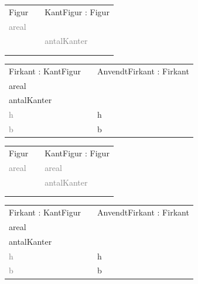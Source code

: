 \begin{frame}[fragile] 
\begin{table}[h]
\begin{tabular}{|l|l|l|}
 \cline{1-1} \cline{3-3} 
Figur          &  & KantFigur : Figur    \\ \cline{1-1} \cline{3-3} 
\textcolor{gray}{areal} &  &                      \\
               &  &  \textcolor{gray}{antalKanter} \\
               &  &                      \\
               &  &                      \\ \cline{1-1} \cline{3-3} 
\end{tabular}
\end{table}
\begin{table}[h]
\begin{tabular}{|l|l|l|}
 \cline{1-1} \cline{3-3} 
 Firkant : KantFigur &  & AnvendtFirkant : Firkant    \\ \cline{1-1} \cline{3-3} 
areal      &  &                      \\
antalKanter     &  &                      \\
\textcolor{gray}{h}          &  & h               \\
\textcolor{gray}{b}          &  & b              \\ \cline{1-1} \cline{3-3} 
\end{tabular}
\end{table}
\end{frame}

\begin{frame}[fragile] 
\begin{table}[h]
\begin{tabular}{|l|l|l|}
 \cline{1-1} \cline{3-3} 
Figur          &  & KantFigur : Figur    \\ \cline{1-1} \cline{3-3} 
\textcolor{gray}{areal} &  & \textcolor{gray}{areal}       \\
               &  & \textcolor{gray}{antalKanter} \\
               &  &                      \\
               &  &                      \\ \cline{1-1} \cline{3-3} 
\end{tabular}
\end{table}
\begin{table}[h]
\begin{tabular}{|l|l|l|}
 \cline{1-1} \cline{3-3} 
Firkant : KantFigur &  & AnvendtFirkant : Firkant       \\ \cline{1-1} \cline{3-3} 
areal               &  &                      \\
antalKanter         &  &                      \\
\textcolor{gray}{h}          &  & h                    \\
\textcolor{gray}{b}          &  & b                    \\ \cline{1-1} \cline{3-3} 
\end{tabular}
\end{table} 	
\end{frame}

